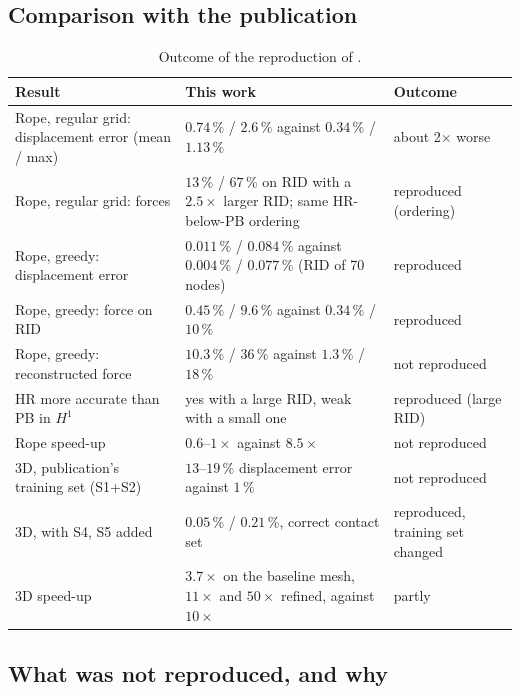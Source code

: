 \subsection*{Comparison with the publication}

\begin{table}[tbp]
\centering\footnotesize
\caption{Outcome of the reproduction of \citet{fauque2018hybrid}.}\label{tab:vf-hb-cmp}
\begin{tabularx}{\linewidth}{@{}>{\raggedright\arraybackslash}p{4.3cm} >{\raggedright\arraybackslash}X >{\raggedright\arraybackslash}p{2.4cm}@{}}
\toprule
Result & This work & Outcome\\
\midrule
Rope, regular grid: displacement error (mean / max) & $0.74\,\%$ / $2.6\,\%$ against $0.34\,\%$ / $1.13\,\%$ & about 2$\times$ worse\\
Rope, regular grid: forces & $13\,\%$ / $67\,\%$ on RID with a $2.5\times$ larger RID; same HR-below-PB ordering & reproduced (ordering)\\
Rope, greedy: displacement error & $0.011\,\%$ / $0.084\,\%$ against $0.004\,\%$ / $0.077\,\%$ (RID of 70 nodes) & reproduced\\
Rope, greedy: force on RID & $0.45\,\%$ / $9.6\,\%$ against $0.34\,\%$ / $10\,\%$ & reproduced\\
Rope, greedy: reconstructed force & $10.3\,\%$ / $36\,\%$ against $1.3\,\%$ / $18\,\%$ & not reproduced\\
HR more accurate than PB in $H^1$ & yes with a large RID, weak with a small one & reproduced (large RID)\\
Rope speed-up & $0.6$--$1\times$ against $8.5\times$ & not reproduced\\
3D, publication's training set (S1+S2) & $13$--$19\,\%$ displacement error against $1\,\%$ & not reproduced\\
3D, with S4, S5 added & $0.05\,\%$ / $0.21\,\%$, correct contact set & reproduced, training set changed\\
3D speed-up & $3.7\times$ on the baseline mesh, $11\times$ and $50\times$ refined, against $10\times$ & partly\\
\bottomrule
\end{tabularx}
\end{table}

\subsection*{What was not reproduced, and why}

